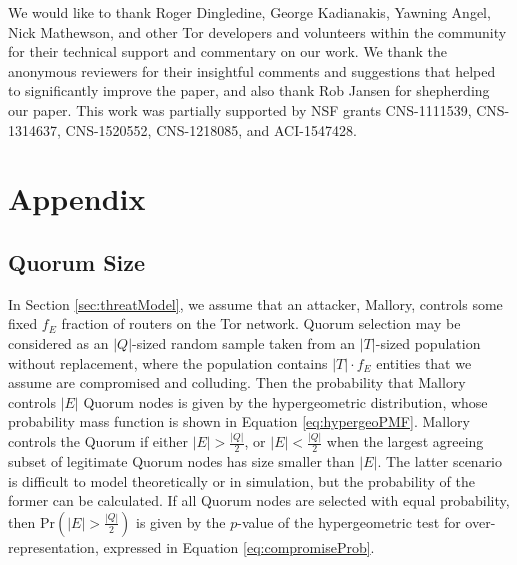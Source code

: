 \documentclass[USenglish,oneside,twocolumn]{article}
\begin{document}
We would like to thank Roger Dingledine, George Kadianakis, Yawning Angel, Nick Mathewson, and other Tor developers and volunteers within the community for their technical support and commentary on our work. We thank the anonymous reviewers for their insightful comments and suggestions that helped to significantly improve the paper, and also thank Rob Jansen for shepherding our paper. This work was partially supported by NSF grants CNS-1111539, CNS-1314637, CNS-1520552, CNS-1218085, and ACI-1547428.

 


\appendix
\vspace{-5pt}
\section{Appendix}


\subsection{Quorum Size}
\label{sec:qSize}

In Section \ref{sec:threatModel}, we assume that an attacker, Mallory, controls some fixed $ f_{E} $ fraction of routers on the Tor network. Quorum selection may be considered as an $ \left\vert{Q}\right\vert $-sized random sample taken from an $ \left\vert{T}\right\vert $-sized population without replacement, where the population contains $ \left\vert{T}\right\vert \cdot f_{E} $ entities that we assume are compromised and colluding. Then the probability that Mallory controls $ \left\vert{E}\right\vert $ Quorum nodes is given by the hypergeometric distribution, whose probability mass function is shown in Equation \ref{eq:hypergeoPMF}.
 Mallory controls the Quorum if either  $ \left\vert{E}\right\vert > \frac{\left\vert{Q}\right\vert}{2} $, or $ \left\vert{E}\right\vert < \frac{\left\vert{Q}\right\vert}{2} $ when the largest agreeing subset of legitimate Quorum nodes has size smaller than $ \left\vert{E}\right\vert$. 
The latter scenario is difficult to model theoretically or in simulation, but the probability of the former can be calculated. If all Quorum nodes are selected with equal probability, then $ \mathrm{Pr}(\left\vert{E}\right\vert > \frac{\left\vert{Q}\right\vert}{2}) $ is given by the $p$-value of the hypergeometric test for over-representation, expressed in Equation \ref{eq:compromiseProb}.
\end{document}
